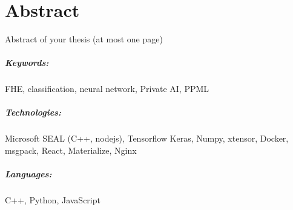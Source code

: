 \chapter*{Abstract}
Abstract of your thesis (at most one page)

\lipsum[1-3]

\paragraph{Keywords:}
FHE, classification, neural network,
Private AI, PPML

\paragraph{Technologies:}
Microsoft SEAL (C++, nodejs),
Tensorflow Keras,
Numpy,
xtensor,
Docker,
msgpack,
React,
Materialize,
Nginx

\paragraph{Languages:}
C++, Python, JavaScript
